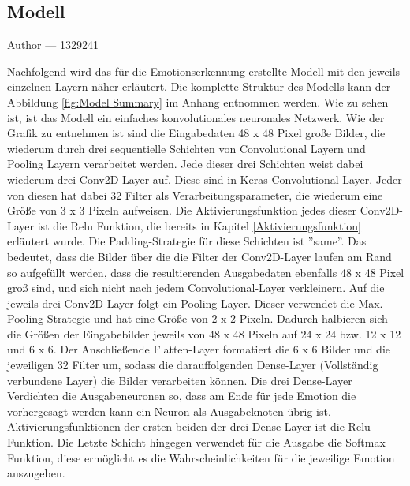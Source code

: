 \documentclass[12pt, a4paper]{report}
\makeatletter
\newcommand{\sectionauthor}[1]{%
  {\parindent0pt\vspace*{-5pt}%
  \large{Author --- }
  \linespread{1.1}\large\scshape#1%
  \par\nobreak\vspace*{35pt} }
  \@afterheading%
}
\makeatother
\begin{document}
\subsection{Modell}
\sectionauthor{1329241}
Nachfolgend wird das für die Emotionserkennung erstellte Modell mit den jeweils einzelnen Layern näher erläutert. Die komplette Struktur des Modells kann der Abbildung \ref{fig:Model Summary} im Anhang entnommen werden.
Wie zu sehen ist, ist das Modell ein einfaches konvolutionales neuronales Netzwerk. 
Wie der Grafik zu entnehmen ist sind die Eingabedaten 48 x 48 Pixel große Bilder, die wiederum durch drei sequentielle Schichten von Convolutional Layern und Pooling Layern verarbeitet werden. Jede dieser drei Schichten weist dabei wiederum drei Conv2D-Layer auf. Diese sind in Keras Convolutional-Layer. Jeder von diesen hat dabei 32 Filter als Verarbeitungsparameter, die wiederum eine Größe von 3 x 3 Pixeln aufweisen. Die Aktivierungsfunktion jedes dieser Conv2D-Layer ist die Relu Funktion, die bereits in Kapitel \ref{Aktivierungsfunktion} erläutert wurde. Die Padding-Strategie für diese Schichten ist ''same''. Das bedeutet, dass die Bilder über die die Filter der Conv2D-Layer laufen am Rand so aufgefüllt werden, dass die resultierenden Ausgabedaten ebenfalls 48 x 48 Pixel groß sind, und sich nicht nach jedem  Convolutional-Layer verkleinern. Auf die jeweils drei Conv2D-Layer folgt ein Pooling Layer. Dieser verwendet die Max. Pooling Strategie und hat eine Größe von 2 x 2 Pixeln. Dadurch halbieren sich die Größen der Eingabebilder jeweils von 48 x 48 Pixeln auf 24 x 24 bzw. 12 x 12 und 6 x 6. Der Anschließende Flatten-Layer formatiert die 6 x 6 Bilder und die jeweiligen 32 Filter um, sodass die darauffolgenden Dense-Layer (Vollständig verbundene Layer) die Bilder verarbeiten können. Die drei Dense-Layer Verdichten die Ausgabeneuronen so, dass am Ende für jede Emotion die vorhergesagt werden kann ein Neuron als Ausgabeknoten übrig ist. Aktivierungsfunktionen der ersten beiden der drei Dense-Layer ist die Relu Funktion. Die Letzte Schicht hingegen verwendet für die Ausgabe die Softmax Funktion, diese ermöglicht es die Wahrscheinlichkeiten für die jeweilige Emotion auszugeben.
\end{document}
